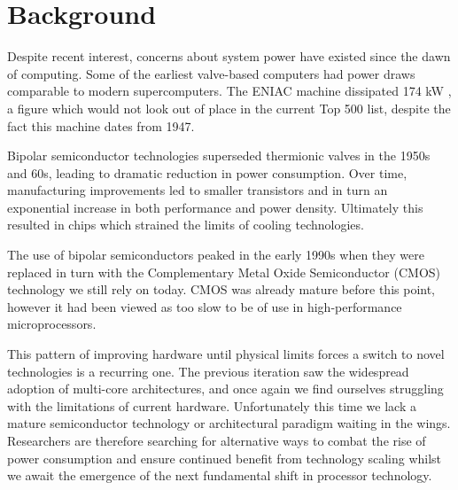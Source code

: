 \section{Background}
\label{sec:background}
Despite recent interest, concerns about system power have existed since the dawn of computing. Some of the earliest valve-based computers had power draws comparable to modern supercomputers. The ENIAC machine dissipated 174 kW \cite{birnbaum:2000aa}, a figure which would not look out of place in the current Top 500 list, despite the fact this machine dates from 1947.\golden

Bipolar semiconductor technologies superseded thermionic valves in the 1950s and 60s, leading to dramatic reduction in power consumption. Over time, manufacturing improvements led to smaller transistors and in turn an exponential increase in both performance and power density. Ultimately this resulted in chips which strained the limits of cooling technologies. \golden

The use of bipolar semiconductors peaked in the early 1990s when they were replaced in turn with the Complementary Metal Oxide Semiconductor (CMOS) technology we still rely on today. CMOS was already mature before this point, however it had been viewed as too slow to be of use in high-performance microprocessors. \golden



This pattern of improving hardware until physical limits forces a switch to novel technologies is a recurring one. The previous iteration saw the widespread adoption of multi-core architectures, and once again we find ourselves struggling with the limitations of current hardware. Unfortunately this time we lack a mature semiconductor technology or architectural paradigm waiting in the wings. Researchers are therefore searching for alternative ways to combat the rise of power consumption and ensure continued benefit from technology scaling whilst we await the emergence of the next fundamental shift in processor technology. \golden



